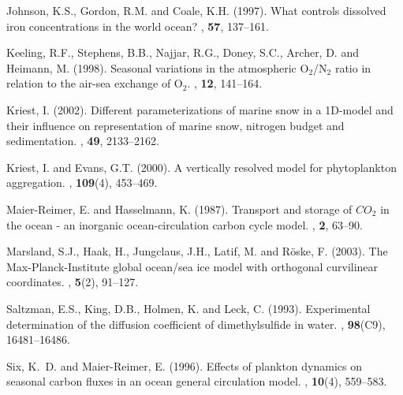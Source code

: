 \documentclass[11pt,a4paper,fleqn,twoside]{article}
\begin{document}
\begin{thebibliography}{}
Johnson, K.S., Gordon, R.M. and Coale, K.H. (1997).
\newblock What controls dissolved iron concentrations in the world ocean?
, {\bf 57}, 137--161.

Keeling, R.F., Stephens, B.B., Najjar, R.G., Doney, S.C., Archer, D. and
  Heimann, M. (1998).
\newblock Seasonal variations in the atmospheric O$_2$/N$_2$ ratio in relation
  to the air-sea exchange of O$_2$.
, {\bf 12}, 141--164.

Kriest, I. (2002).
\newblock Different parameterizations of marine snow in a 1D-model and their
  influence on representation of marine snow, nitrogen budget and
  sedimentation.
, {\bf 49}, 2133--2162.

Kriest, I. and Evans, G.T. (2000).
\newblock A vertically resolved model for phytoplankton aggregation.
,
  {\bf 109}(4), 453--469.

Maier-Reimer, E. and Hasselmann, K. (1987).
\newblock Transport and storage of $CO_2$ in the ocean - an inorganic
  ocean-circulation carbon cycle model.
, {\bf 2}, 63--90.

Marsland, S.J., Haak, H., Jungclaus, J.H., Latif, M. and R\"oske, F. (2003).
\newblock The {Max-Planck-Institute} global ocean/sea ice model with orthogonal
  curvilinear coordinates.
, {\bf 5}(2), 91--127.

Saltzman, E.S., King, D.B., Holmen, K. and Leck, C. (1993).
\newblock Experimental determination of the diffusion coefficient of
  dimethylsulfide in water.
, {\bf 98}(C9), 16481--16486.

Six, K.~D. and Maier-Reimer, E. (1996).
\newblock Effects of plankton dynamics on seasonal carbon fluxes in an ocean
  general circulation model.
, {\bf 10}(4), 559--583.


\end{thebibliography}
\end{document}
